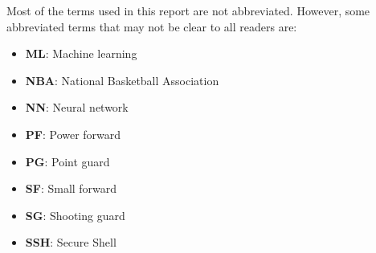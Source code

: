 Most of the terms used in this report are not abbreviated. However, some abbreviated terms that may not be clear to all readers are:\\
\begin{itemize}
\item\textbf{ML}: Machine learning
\item\textbf{NBA}: National Basketball Association
\item\textbf{NN}: Neural network
\item\textbf{PF}: Power forward
\item\textbf{PG}: Point guard
\item\textbf{SF}: Small forward
\item\textbf{SG}: Shooting guard
\item\textbf{SSH}: Secure Shell
\end{itemize}
